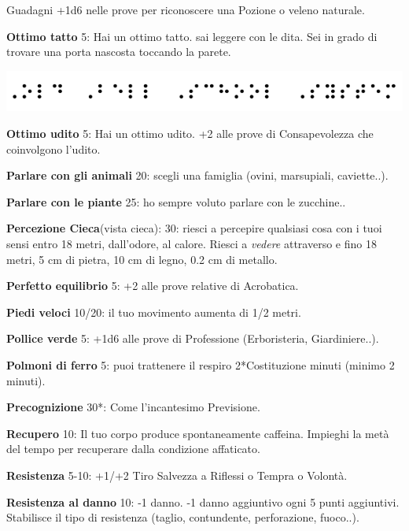 \documentclass[a4paper,twoside,openany]{book}
\begin{document}
\begin{multicols}{2}
Guadagni +1d6 nelle prove per riconoscere una Pozione o veleno naturale.

\textbf{Ottimo tatto} 5: Hai un ottimo tatto. sai leggere con le dita. Sei in grado di trovare una porta nascosta toccando la parete.

\begin{center}
\includegraphics[width=0.9\linewidth]{immagini/braille2.png}
\end{center}


\textbf{Ottimo udito} 5: Hai un ottimo udito. +2 alle prove di Consapevolezza che coinvolgono l'udito.

\textbf{Parlare con gli animali} 20: scegli una famiglia (ovini, marsupiali, caviette..).

\textbf{Parlare con le piante} 25: ho sempre voluto parlare con le zucchine..

\textbf{Percezione Cieca}(vista cieca): 30: riesci a percepire qualsiasi cosa con i tuoi sensi entro 18 metri, dall'odore, al calore. Riesci a \emph{vedere} attraverso e fino 18 metri, 5 cm di pietra, 10 cm di legno, 0.2 cm di metallo.

\textbf{Perfetto equilibrio} 5: +2 alle prove relative di Acrobatica.

\textbf{Piedi veloci} 10/20: il tuo movimento aumenta di 1/2 metri.

\textbf{Pollice verde} 5: +1d6 alle prove di Professione (Erboristeria, Giardiniere..).

\textbf{Polmoni di ferro} 5: puoi trattenere il respiro 2*Costituzione minuti (minimo 2 minuti).

\textbf{Precognizione} 30{*}: Come l'incantesimo Previsione.

\textbf{Recupero} 10: Il tuo corpo produce spontaneamente caffeina. Impieghi la metà del tempo per recuperare dalla condizione affaticato.

\textbf{Resistenza} 5-10: +1/+2 Tiro Salvezza a Riflessi o Tempra o Volontà.

\textbf{Resistenza al danno} 10: -1 danno. -1 danno aggiuntivo ogni 5 punti aggiuntivi. Stabilisce il tipo di resistenza (taglio, contundente, perforazione, fuoco..).


\end{multicols}
\end{document}
